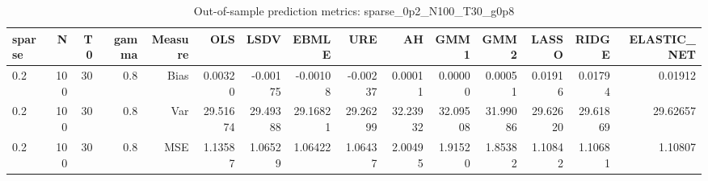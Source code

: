 \begin{table}[!htbp]\centering
\caption{Out-of-sample prediction metrics: sparse_0p2_N100_T30_g0p8}
\label{tab:table3_sparse_0p2_N100_T30_g0p8}
\begin{tabular}{lrrrrrrrrrrrrrr}
\hline
sparse & N & T0 & gamma & Measure & OLS & LSDV & EBMLE & URE & AH & GMM1 & GMM2 & LASSO & RIDGE & ELASTIC_NET \\
\hline
0.2 & 100 & 30 & 0.8 & Bias & 0.00320 & -0.00175 & -0.00108 & -0.00237 & 0.00011 & 0.00000 & 0.00051 & 0.01916 & 0.01794 & 0.01912 \\
0.2 & 100 & 30 & 0.8 & Var & 29.51674 & 29.49388 & 29.16821 & 29.26299 & 32.23932 & 32.09508 & 31.99086 & 29.62620 & 29.61869 & 29.62657 \\
0.2 & 100 & 30 & 0.8 & MSE & 1.13587 & 1.06529 & 1.06422 & 1.06437 & 2.00495 & 1.91520 & 1.85382 & 1.10842 & 1.10681 & 1.10807 \\
\hline
\end{tabular}
\end{table}

